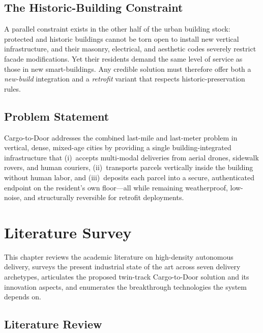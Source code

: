 \documentclass[11pt,a4paper]{report}
\begin{document}
\section{The Historic-Building Constraint}

A parallel constraint exists in the other half of the urban building
stock: protected and historic buildings cannot be torn open to install
new vertical infrastructure, and their masonry, electrical, and aesthetic
codes severely restrict facade modifications. Yet their residents demand
the same level of service as those in new smart-buildings. Any credible
solution must therefore offer both a \emph{new-build} integration and a
\emph{retrofit} variant that respects historic-preservation rules.

\section{Problem Statement}

Cargo-to-Door addresses the combined last-mile and last-meter problem in
vertical, dense, mixed-age cities by providing a single
building-integrated infrastructure that (i)~accepts multi-modal
deliveries from aerial drones, sidewalk rovers, and human couriers,
(ii)~transports parcels vertically inside the building without human
labor, and (iii)~deposits each parcel into a secure, authenticated
endpoint on the resident's own floor---all while remaining
weatherproof, low-noise, and structurally reversible for retrofit
deployments.

\chapter{Literature Survey}
\label{ch:literature}

This chapter reviews the academic literature on high-density autonomous
delivery, surveys the present industrial state of the art across seven
delivery archetypes, articulates the proposed twin-track Cargo-to-Door
solution and its innovation aspects, and enumerates the breakthrough
technologies the system depends on.

\section{Literature Review}
\label{sec:lit-review}
\end{document}
